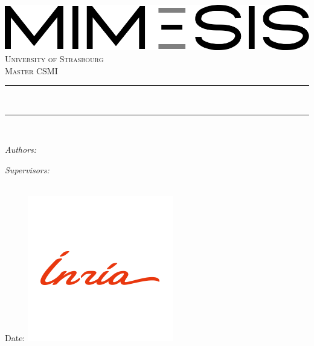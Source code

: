 \begin{titlepage}

\newcommand{\HRule}{\rule{\linewidth}{0.5mm}}

\begin{center}
	\includegraphics[width = 0.5\linewidth]{images/logo-mimesis.png} \\ [1.5cm] 

	\textsc{\Large University of Strasbourg}\\[0.5cm] 
	\textsc{\large Master CSMI}\\[0.95cm] 
	
	\HRule \\[0.4cm]
	\huge\bfseries\reporttitle\par %
	\HRule \\[0.4cm]
\end{center}

\vspace{1cm}

\begin{flushleft} \large
	\begin{minipage}{0.4\hsize}
		\textit{Authors:}\\
		\reportauthorOne
	\end{minipage} \hfill 
	\begin{minipage}{0.4\hsize}
		\textit{Supervisors:}\\
		\reportsupervisorOne\\
		\reportsupervisorTwo
	\end{minipage}
\end{flushleft}
\vspace{3 cm}
\makeatletter
Date: \@date
\hfill
\includegraphics[width = 0.2\linewidth]{images/inria.png}\\[1.5cm] 

\vfill %



\makeatother


\end{titlepage}

